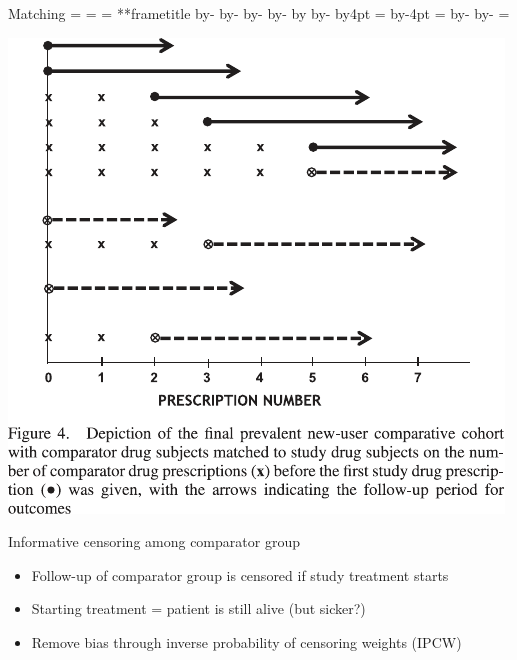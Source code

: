 \documentclass[aspectratio=169,12pt]{beamer} %
\makeatletter
\newif\ifsidebartheme
\newcommand*{\calculatespace}{%
    \contentheight=\paperheight%
    \ifx\beamer@frametitle\@empty%
        \setbox\@tempboxa=\box\voidb@x%
      \else%
        \setbox\@tempboxa=\vbox{%
          \vbox{}%
          {\parskip0pt\usebeamertemplate***{frametitle}}%
        }%
        \ifsidebartheme%
          \advance\contentheight by-1em%
        \fi%
      \fi%
    \advance\contentheight by-\ht\@tempboxa%
    \advance\contentheight by-\dp\@tempboxa%
    \advance\contentheight by-\beamer@frametopskip%
    \ifbeamer@plainframe%
    \contentbottom=0pt%
    \else%
    \advance\contentheight by-\headheight%
    \advance\contentheight by\headdp%
    \advance\contentheight by-\footheight%
    \advance\contentheight by4pt%
    \contentbottom=\footheight%
    \advance\contentbottom by-4pt%
    \fi%
    \contentwidth=\paperwidth%
    \ifbeamer@plainframe%
    \contentleft=0pt%
    \else%
    \advance\contentwidth by-\beamer@rightsidebar%
    \advance\contentwidth by-\beamer@leftsidebar\relax%
    \contentleft=\beamer@leftsidebar%
    \fi%
}
\makeatother
\begin{document}
\begin{frame}{Matching}
    \calculatespace%
    \begin{center}
	\includegraphics[height=0.85\contentheight]{ref/suimoodell-fig4.pdf}
    \end{center}
\end{frame}

\begin{frame}{Informative censoring among comparator group}
    \begin{itemize}
	\item Follow-up of comparator group is censored if study treatment starts
	\item Starting treatment = patient is still alive (but sicker?)
	\item Remove bias through inverse probability of censoring weights (IPCW)
    \end{itemize}
\end{frame}
\end{document}

